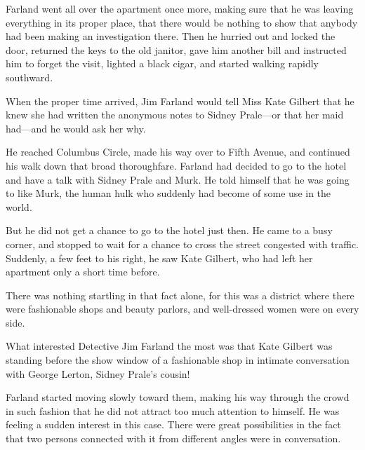 \documentclass{novel}
\begin{document}
Farland went all over the apartment once more, making sure that he was leaving everything in its proper place, that there would be nothing to show that anybody had been making an investigation there. Then he hurried out and locked the door, returned the keys to the old janitor, gave him another bill and instructed him to forget the visit, lighted a black cigar, and started walking rapidly southward.

When the proper time arrived, Jim Farland would tell Miss Kate Gilbert that he knew she had written the anonymous notes to Sidney Prale---or that her maid had---and he would ask her why.

He reached Columbus Circle, made his way over to Fifth Avenue, and continued his walk down that broad thoroughfare. Farland had decided to go to the hotel and have a talk with Sidney Prale and Murk. He told himself that he was going to like Murk, the human hulk who suddenly had become of some use in the world.

But he did not get a chance to go to the hotel just then. He came to a busy corner, and stopped to wait for a chance to cross the street congested with traffic. Suddenly, a few feet to his right, he saw Kate Gilbert, who had left her apartment only a short time before.

There was nothing startling in that fact alone, for this was a district where there were fashionable shops and beauty parlors, and well-dressed women were on every side.

What interested Detective Jim Farland the most was that Kate Gilbert was standing before the show window of a fashionable shop in intimate conversation with George Lerton, Sidney Prale's cousin!

\vspace{2\nbs}
\clearpage
\thispagestyle{empty}

\begin{ChapterStart}
\vspace{3\nbs}
\end{ChapterStart}
    
Farland started moving slowly toward them, making his way through the crowd in such fashion that he did not attract too much attention to himself. He was feeling a sudden interest in this case. There were great possibilities in the fact that two persons connected with it from different angles were in conversation.
\end{document}
